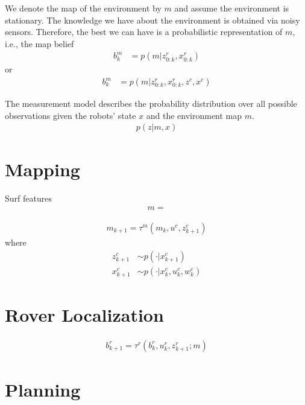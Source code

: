 \documentclass[conference]{IEEEtran}
\begin{document}
We denote the map of the environment by $m$ and assume the environment is stationary. The knowledge we have about the environment is obtained via noisy sensors. Therefore, the best we can have is a probabilistic representation of $m$, i.e., the map belief
\begin{align}
    b^{m}_k&=p(m | z^r_{0:k}, x^r_{0:k})
\end{align}
or
\begin{align}
    b^{m}_k&=p(m | z^r_{0:k}, x^r_{0:k}, z^c, x^c)
\end{align}

The measurement model describes the probability distribution over all possible observations given the robots' state $x$ and the environment map $m$.
\begin{align}
    p(z|m, x)
\end{align}


\section{Mapping}

Surf features
\begin{align}
    m=
\end{align}


\begin{align}
    m_{k+1}=\tau^m (m_k, u^c, z^c_{k+1})
\end{align}
where
\begin{align}
    z^c_{k+1} &\sim p(\cdot |x^c_{k+1})\\
    x^c_{k+1} &\sim p(\cdot |x^c_k, u^c_k, w^c_k)
\end{align}


\section{Rover Localization}

\begin{align}
    b^r_{k+1}=\tau^r (b^r_k, u^r_k, z^r_{k+1}; m)
\end{align}


\section{Planning}
\end{document}
